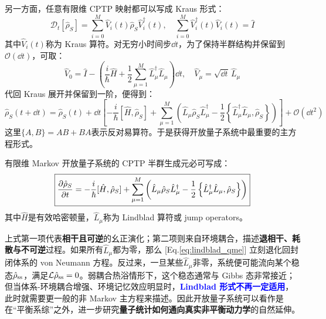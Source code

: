 另一方面，任意有限维 CPTP 映射都可以写成 Kraus 形式：
\[\mathcal{D}_t[\hat{\rho}_S]=\sum_{i=0}^{M}\hat{V}_i(t)\hat{\rho}_S\hat{V}_i^\dagger(t),\quad \sum_{i=0}^{M}\hat{V}_i^\dagger(t)\hat{V}_i(t)=\hat{I}\]
其中$\hat{V}_i(t)$称为 Kraus 算符。对无穷小时间步$\dd t$，为了保持半群结构并保留到$\mathcal{O}(\dd t)$，可取：
\[\hat{V}_0=\hat{I}-\left(\frac{i}{\hbar}\hat{H}+\frac{1}{2}\sum_{\mu=1}^{M}\hat{L}_\mu^\dagger \hat{L}_\mu\right)\dd t,\quad \hat{V}_\mu=\sqrt{\dd t}\,\hat{L}_\mu\]
代回 Kraus 展开并保留到一阶，便得到：
\[
\hat{\rho}_S(t+\dd t)=\hat{\rho}_S(t)+\dd t\left[-\frac{i}{\hbar}[\hat{H},\hat{\rho}_S]+\sum_{\mu=1}^{M}\left(\hat{L}_\mu \hat{\rho}_S \hat{L}_\mu^\dagger-\frac{1}{2}\left\{\hat{L}_\mu^\dagger \hat{L}_\mu,\hat{\rho}_S\right\}\right)\right]+\mathcal{O}(\dd t^2)
\]
这里$\{A,B\}=AB+BA$表示反对易算符。于是获得开放量子系统中最重要的主方程形式。
\begin{theorem}
有限维 Markov 开放量子系统的 CPTP 半群生成元必可写成：
\begin{equation}\label{eq:lindblad_qme}
\boxed{\pdv{\hat{\rho}_S}{t}=-\frac{i}{\hbar}[\hat{H},\hat{\rho}_S]+\sum_{\mu=1}^{M}\left(\hat{L}_\mu \hat{\rho}_S \hat{L}_\mu^\dagger-\frac{1}{2}\left\{\hat{L}_\mu^\dagger \hat{L}_\mu,\hat{\rho}_S\right\}\right)}
\end{equation}
其中$\hat{H}$是有效哈密顿量，$\hat{L}_\mu$称为 Lindblad 算符或 jump operators。
\end{theorem}

上式第一项代表\textbf{相干且可逆}的幺正演化；第二项则来自环境耦合，描述\textbf{退相干、耗散与不可逆}过程。如果所有$\hat{L}_\mu$都为零，那么 [Eq.\eqref{eq:lindblad_qme}] 立刻退化回封闭体系的 von Neumann 方程。反过来，一旦某些$\hat{L}_\mu$非零，系统便可能流向某个稳态$\hat{\rho}_{\rm ss}$，满足$\mathcal{L}\hat{\rho}_{\rm ss}=0$。弱耦合热浴情形下，这个稳态通常与 Gibbs 态非常接近；但当体系-环境耦合增强、环境记忆效应明显时，\textcolor{blue}{\textbf{Lindblad 形式不再一定适用}}，此时就需要更一般的非 Markov 主方程来描述。因此开放量子系统可以看作是在“平衡系综”之外，进一步研究\textbf{量子统计如何通向真实非平衡动力学}的自然延伸。

\newpage
